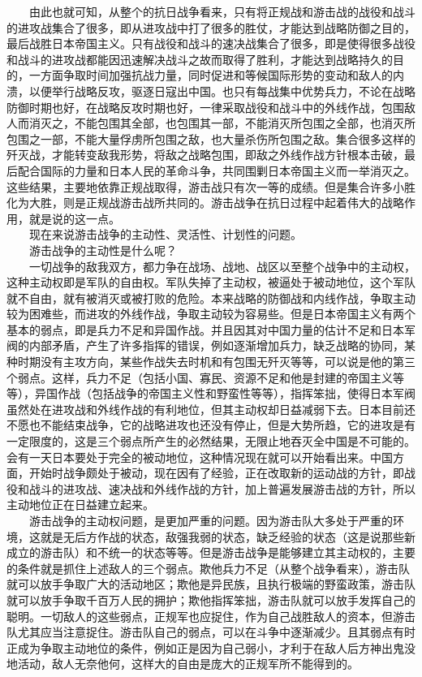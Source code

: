 \documentclass[cn,11pt,chinese]{elegantbook}
\begin{document}
　　由此也就可知，从整个的抗日战争看来，只有将正规战和游击战的战役和战斗的进攻战集合了很多，即从进攻战中打了很多的胜仗，才能达到战略防御之目的，最后战胜日本帝国主义。只有战役和战斗的速决战集合了很多，即是使得很多战役和战斗的进攻战都能因迅速解决战斗之故而取得了胜利，才能达到战略持久的目的，一方面争取时间加强抗战力量，同时促进和等候国际形势的变动和敌人的内溃，以便举行战略反攻，驱逐日寇出中国。也只有每战集中优势兵力，不论在战略防御时期也好，在战略反攻时期也好，一律采取战役和战斗中的外线作战，包围敌人而消灭之，不能包围其全部，也包围其一部，不能消灭所包围之全部，也消灭所包围之一部，不能大量俘虏所包围之敌，也大量杀伤所包围之敌。集合很多这样的歼灭战，才能转变敌我形势，将敌之战略包围，即敌之外线作战方针根本击破，最后配合国际的力量和日本人民的革命斗争，共同围剿日本帝国主义而一举消灭之。这些结果，主要地依靠正规战取得，游击战只有次一等的成绩。但是集合许多小胜化为大胜，则是正规战游击战所共同的。游击战争在抗日过程中起着伟大的战略作用，就是说的这一点。\\
　　现在来说游击战争的主动性、灵活性、计划性的问题。\\
　　游击战争的主动性是什么呢？\\
　　一切战争的敌我双方，都力争在战场、战地、战区以至整个战争中的主动权，这种主动权即是军队的自由权。军队失掉了主动权，被逼处于被动地位，这个军队就不自由，就有被消灭或被打败的危险。本来战略的防御战和内线作战，争取主动较为困难些，而进攻的外线作战，争取主动较为容易些。但是日本帝国主义有两个基本的弱点，即是兵力不足和异国作战。并且因其对中国力量的估计不足和日本军阀的内部矛盾，产生了许多指挥的错误，例如逐渐增加兵力，缺乏战略的协同，某种时期没有主攻方向，某些作战失去时机和有包围无歼灭等等，可以说是他的第三个弱点。这样，兵力不足（包括小国、寡民、资源不足和他是封建的帝国主义等等），异国作战（包括战争的帝国主义性和野蛮性等等），指挥笨拙，使得日本军阀虽然处在进攻战和外线作战的有利地位，但其主动权却日益减弱下去。日本目前还不愿也不能结束战争，它的战略进攻也还没有停止，但是大势所趋，它的进攻是有一定限度的，这是三个弱点所产生的必然结果，无限止地吞灭全中国是不可能的。会有一天日本要处于完全的被动地位，这种情况现在就可以开始看出来。中国方面，开始时战争颇处于被动，现在因有了经验，正在改取新的运动战的方针，即战役和战斗的进攻战、速决战和外线作战的方针，加上普遍发展游击战的方针，所以主动地位正在日益建立起来。\\
　　游击战争的主动权问题，是更加严重的问题。因为游击队大多处于严重的环境，这就是无后方作战的状态，敌强我弱的状态，缺乏经验的状态（这是说那些新成立的游击队）和不统一的状态等等。但是游击战争是能够建立其主动权的，主要的条件就是抓住上述敌人的三个弱点。欺他兵力不足（从整个战争看来），游击队就可以放手争取广大的活动地区；欺他是异民族，且执行极端的野蛮政策，游击队就可以放手争取千百万人民的拥护；欺他指挥笨拙，游击队就可以放手发挥自己的聪明。一切敌人的这些弱点，正规军也应捉住，作为自己战胜敌人的资本，但游击队尤其应当注意捉住。游击队自己的弱点，可以在斗争中逐渐减少。且其弱点有时正成为争取主动地位的条件，例如正是因为自己弱小，才利于在敌人后方神出鬼没地活动，敌人无奈他何，这样大的自由是庞大的正规军所不能得到的。\\
\end{document}
